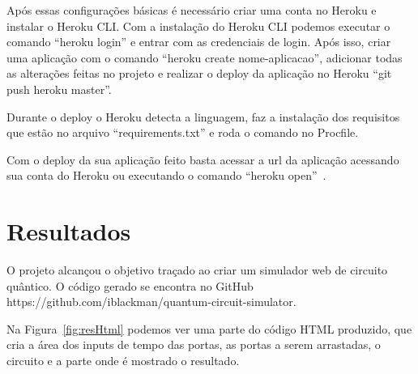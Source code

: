 \documentclass[a4paper, 12pt, oneside]{book}
\begin{document}
Após essas configurações básicas é necessário criar uma conta no Heroku e instalar o Heroku CLI. Com a instalação do Heroku CLI podemos executar o comando ``heroku login'' e entrar com as credenciais de login. Após isso, criar uma aplicação com o comando ``heroku create nome-aplicacao'', adicionar todas as alterações feitas no projeto e realizar o deploy da aplicação no Heroku ``git push heroku master''.

Durante o deploy o Heroku detecta a linguagem, faz a instalação dos requisitos que estão no arquivo ``requirements.txt'' e roda o comando no Procfile.

Com o deploy da sua aplicação feito basta acessar a url da aplicação acessando sua conta do Heroku ou executando o comando ``heroku open''~\cite{heroku-python}.

\section{Resultados}

O projeto alcançou o objetivo traçado ao criar um simulador web de circuito quântico. O código gerado se encontra no GitHub https://github.com/iblackman/quantum-circuit-simulator.

Na Figura~\ref{fig:resHtml} podemos ver uma parte do código HTML produzido, que cria a área dos inputs de tempo das portas, as portas a serem arrastadas, o circuito e a parte onde é mostrado o resultado.
\end{document}
